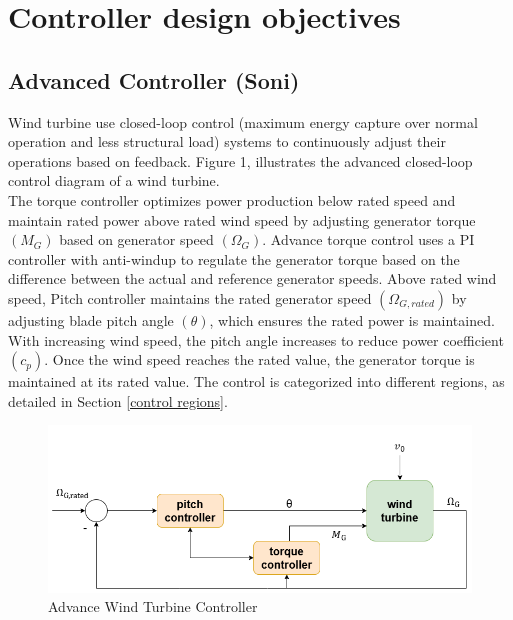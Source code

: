 \chapter{Controller design objectives}
\section{Advanced Controller (Soni)} \label{Advanced controller}

Wind turbine use closed-loop control (maximum energy capture over normal operation and less structural load) systems to continuously adjust their operations based on feedback. Figure 1, illustrates the advanced closed-loop control diagram of a wind turbine. 
\\[16pt]
The torque controller optimizes power production below rated speed and maintain rated power above rated wind speed by adjusting generator torque $(M_G)$ based on generator speed $(\Omega_G)$. Advance torque control uses a PI controller with anti-windup to regulate the generator torque based on the difference between the actual and reference generator speeds. Above rated wind speed, Pitch controller maintains the rated generator speed $(\Omega_{G,rated})$ by adjusting blade pitch angle $(\theta)$, which ensures the rated power is maintained. With increasing wind speed, the pitch angle increases to reduce power coefficient $(c_p)$. Once the wind speed reaches the rated value, the generator torque is maintained at its rated value. The control is categorized into different regions, as detailed in Section \ref{control regions}.

\begin{figure}[htbp]
	\centering
	\includegraphics[width=\textwidth]{Figures/Figure_1.png}
	\caption{Advance Wind Turbine Controller}
	\label{fig:Advance Wind Turbine Controller}
\end{figure}
 

